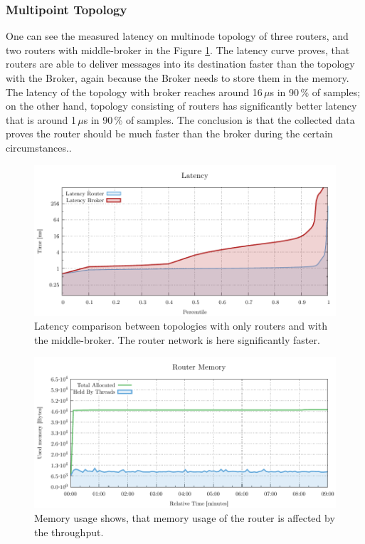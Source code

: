 \subsubsection*{Multipoint Topology}
One can see the measured latency on multinode topology of three routers, and two routers with middle-broker in the Figure \ref{fig:latency-multipoint-router}. The latency curve proves, that routers are able to deliver messages into its destination faster than the topology with the Broker, again because the Broker needs to store them in the memory. The latency of the topology with broker reaches around 16\,$\mu$s in 90\,\% of samples; on the other hand, topology consisting of routers has significantly better latency that is around 1\,$\mu$s in 90\,\% of samples. The conclusion is that the collected data proves the router should be much faster than the broker during the certain circumstances..

\begin{figure}[H]
	\centering
	\includegraphics[width=1\linewidth]{obrazky-figures/charts/multipoint-latency.pdf}
	\caption{Latency comparison between topologies with only routers and with the middle-broker. The router network is here significantly faster.}
	\label{fig:latency-multipoint-router}
\end{figure}

\begin{figure}[H]
	\centering
	\includegraphics[width=1\linewidth]{obrazky-figures/charts/multipoint-router-only-latency-memory.pdf}
	\caption{Memory usage shows, that memory usage of the router is affected by the throughput.}
	\label{fig:latency-multiple-router-memory}
\end{figure}

